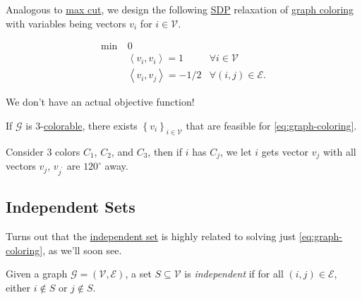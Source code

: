 Analogous to \hyperref[prb:max-cut]{max cut}, we design the following \hyperref[eq:graph-coloring]{SDP} relaxation of \hyperref[prb:graph-coloring]{graph coloring} with variables being vectors \(v_i\) for \(i\in \mathcal{V} \).

\begin{equation}\label{eq:graph-coloring}
	\begin{aligned}
		\min~ & 0                                                                             \\
		      & \left\langle v_i, v_i \right\rangle = 1      & \forall i\in \mathcal{V}       \\
		      & \left\langle v_i, v_j \right\rangle = -1 / 2 & \forall (i, j)\in \mathcal{E}.
	\end{aligned}
\end{equation}

\begin{note}
	We don't have an actual objective function!
\end{note}

\begin{claim}
	If \(\mathcal{G} \) is \(3\)-\hyperref[def:coloring]{colorable}, there exists \(\left\{ v_i \right\}_{i\in \mathcal{V} } \) that are feasible for \autoref{eq:graph-coloring}.
\end{claim}
\begin{explanation}
	Consider \(3\) colors \(C_1\), \(C_2\), and \(C_3\), then if \(i\) has \(C_j\), we let \(i\) gets vector \(v_j\) with all vectors \(v_j\), \(v_{j^\prime }\) are \(120^{\circ } \) away.
	\begin{center}
	\end{center}
\end{explanation}

\subsection{Independent Sets}
Turns out that the \hyperref[def:independent-set]{independent set} is highly related to solving just \autoref{eq:graph-coloring}, as we'll soon see.

\begin{definition}\label{def:independent-set}
	Given a graph \(\mathcal{G} =(\mathcal{V} , \mathcal{E} )\), a set \(S \subseteq \mathcal{V} \) is \emph{independent} if for all \((i, j)\in \mathcal{E} \), either \(i \notin S\) or \(j \notin S\).
\end{definition}


